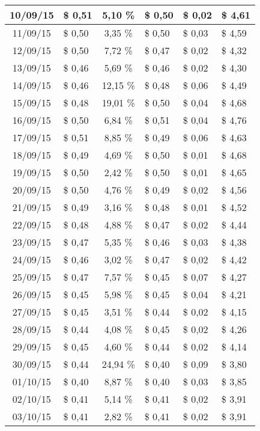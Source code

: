 \begin{center}
\begin{small}
\begin{longtable}{|c|l|c|l|l|l|}
10/09/15 & \$ 0,51 & 5,10 \% & \$ 0,50 & \$ 0,02 & \$ 4,61 \\ \hline
11/09/15 & \$ 0,50 & 3,35 \% & \$ 0,50 & \$ 0,03 & \$ 4,59 \\ \hline
12/09/15 & \$ 0,50 & 7,72 \% & \$ 0,47 & \$ 0,02 & \$ 4,32 \\ \hline
13/09/15 & \$ 0,46 & 5,69 \% & \$ 0,46 & \$ 0,02 & \$ 4,30 \\ \hline
14/09/15 & \$ 0,46 & 12,15 \% & \$ 0,48 & \$ 0,06 & \$ 4,49 \\ \hline
15/09/15 & \$ 0,48 & 19,01 \% & \$ 0,50 & \$ 0,04 & \$ 4,68 \\ \hline
16/09/15 & \$ 0,50 & 6,84 \% & \$ 0,51 & \$ 0,04 & \$ 4,76 \\ \hline
17/09/15 & \$ 0,51 & 8,85 \% & \$ 0,49 & \$ 0,06 & \$ 4,63 \\ \hline
18/09/15 & \$ 0,49 & 4,69 \% & \$ 0,50 & \$ 0,01 & \$ 4,68 \\ \hline
19/09/15 & \$ 0,50 & 2,42 \% & \$ 0,50 & \$ 0,01 & \$ 4,65 \\ \hline
20/09/15 & \$ 0,50 & 4,76 \% & \$ 0,49 & \$ 0,02 & \$ 4,56 \\ \hline
21/09/15 & \$ 0,49 & 3,16 \% & \$ 0,48 & \$ 0,01 & \$ 4,52 \\ \hline
22/09/15 & \$ 0,48 & 4,88 \% & \$ 0,47 & \$ 0,02 & \$ 4,44 \\ \hline
23/09/15 & \$ 0,47 & 5,35 \% & \$ 0,46 & \$ 0,03 & \$ 4,38 \\ \hline
24/09/15 & \$ 0,46 & 3,02 \% & \$ 0,47 & \$ 0,02 & \$ 4,42 \\ \hline
25/09/15 & \$ 0,47 & 7,57 \% & \$ 0,45 & \$ 0,07 & \$ 4,27 \\ \hline
26/09/15 & \$ 0,45 & 5,98 \% & \$ 0,45 & \$ 0,04 & \$ 4,21 \\ \hline
27/09/15 & \$ 0,45 & 3,51 \% & \$ 0,44 & \$ 0,02 & \$ 4,15 \\ \hline
28/09/15 & \$ 0,44 & 4,08 \% & \$ 0,45 & \$ 0,02 & \$ 4,26 \\ \hline
29/09/15 & \$ 0,45 & 4,60 \% & \$ 0,44 & \$ 0,02 & \$ 4,14 \\ \hline
30/09/15 & \$ 0,44 & 24,94 \% & \$ 0,40 & \$ 0,09 & \$ 3,80 \\ \hline
01/10/15 & \$ 0,40 & 8,87 \% & \$ 0,40 & \$ 0,03 & \$ 3,85 \\ \hline
02/10/15 & \$ 0,41 & 5,14 \% & \$ 0,41 & \$ 0,02 & \$ 3,91 \\ \hline
03/10/15 & \$ 0,41 & 2,82 \% & \$ 0,41 & \$ 0,02 & \$ 3,91 \\ \hline

\end{longtable}
\end{small}
\end{center}
